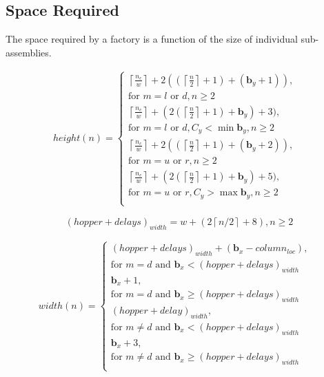 \subsection{Space Required}\label{sec:requiredSpace}
The space required by a factory is a function of the size of individual sub-assemblies.

\begin{align}
height(n)=
\begin{cases}
\left \lceil{   \frac{n_c}{w}}\right \rceil+2((\left \lceil{\frac{n}{2}}\right \rceil+1)+(\mathbf{b}_y+1)),&\\ 
\text{for } m = l \text{ or } d, n \geq 2&\\
\left \lceil{   \frac{n_c}{w}}\right \rceil+(2(\left \lceil{\frac{n}{2}}\right \rceil+1)+\mathbf{b}_y)+3),&\\ 
\text{for } m = l \text{ or } d, C_y  < \min \mathbf{b}_y, n \geq 2&\\
\left \lceil{\frac{n_c}{w}}\right \rceil+2((\left \lceil{\frac{n}{2}}\right \rceil+1)+(\mathbf{b}_y+2)),&\\ 
\text{for } m = u \text{ or } r, n\geq 2&\\
\left \lceil{   \frac{n_c}{w}}\right \rceil+(2(\left \lceil{\frac{n}{2}}\right \rceil+1)+\mathbf{b}_y)+5),&\\ 
\text{for } m = u \text{ or } r, C_y  > \max \mathbf{b}_y, n \geq 2&\\
\end{cases}
\end{align}



\begin{equation}
(hopper+delays)_{width}=w+(2\left \lceil{n/2}\right \rceil+8),  n \geq 2
\end{equation}

\begin{align}
width(n)=
\begin{cases}
(hopper+delays)_{width}+(\mathbf{b}_x-column_{loc}),&\\ 
\text{for } m = d \text{ and } \mathbf{b}_x < (hopper+delays)_{width}&\\
\mathbf{b}_x + 1,&\\ 
\text{for } m = d \text{ and } \mathbf{b}_x \geq (hopper+delays)_{width}&\\
(hopper+delay)_{width},&\\ 
\text{for } m \neq d  \text{ and } \mathbf{b}_x < (hopper+delays)_{width}&\\
\mathbf{b}_x + 3,&\\ 
\text{for } m \neq d \text{ and } \mathbf{b}_x \geq (hopper+delays)_{width}&\\
\end{cases}
\end{align}


